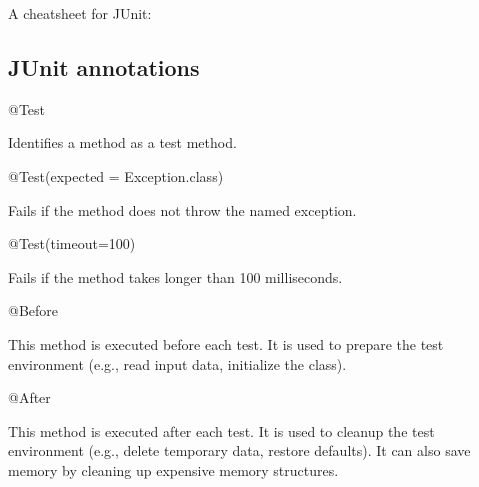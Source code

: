 \documentclass[
]{book}
\newenvironment{Shaded}{\begin{snugshade}}{\end{snugshade}}
\newcommand{\AttributeTok}[1]{\textcolor[rgb]{0.77,0.63,0.00}{#1}}
\newcommand{\BuiltInTok}[1]{#1}
\newcommand{\DecValTok}[1]{\textcolor[rgb]{0.00,0.00,0.81}{#1}}
\newcommand{\FunctionTok}[1]{\textcolor[rgb]{0.00,0.00,0.00}{#1}}
\newcommand{\NormalTok}[1]{#1}
\begin{document}
A cheatsheet for JUnit:

\hypertarget{junit-annotations}{%
\subsection{JUnit annotations}\label{junit-annotations}}

\begin{Shaded}
\begin{Highlighting}[]
\AttributeTok{@Test}
\end{Highlighting}
\end{Shaded}

Identifies a method as a test method.

\begin{Shaded}
\begin{Highlighting}[]
\AttributeTok{@Test}\NormalTok{(expected = }\BuiltInTok{Exception}\NormalTok{.}\FunctionTok{class}\NormalTok{)}
\end{Highlighting}
\end{Shaded}

Fails if the method does not throw the named exception.

\begin{Shaded}
\begin{Highlighting}[]
\AttributeTok{@Test}\NormalTok{(timeout=}\DecValTok{100}\NormalTok{)}
\end{Highlighting}
\end{Shaded}

Fails if the method takes longer than 100 milliseconds.

\begin{Shaded}
\begin{Highlighting}[]
\AttributeTok{@Before}
\end{Highlighting}
\end{Shaded}

This method is executed before each test. It is used to prepare the test environment (e.g., read input data, initialize the class).

\begin{Shaded}
\begin{Highlighting}[]
\AttributeTok{@After}
\end{Highlighting}
\end{Shaded}

This method is executed after each test. It is used to cleanup the test environment (e.g., delete temporary data, restore defaults). It can also save memory by cleaning up expensive memory structures.
\end{document}

